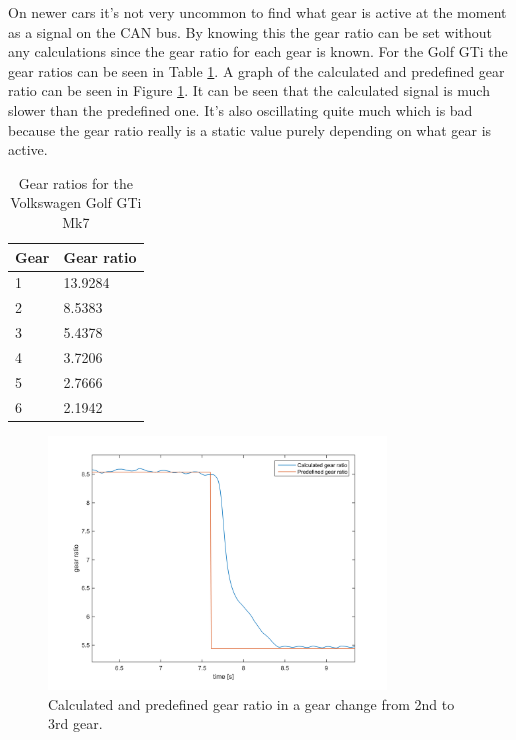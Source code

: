On newer cars it's not very uncommon to find what gear is active at the moment as a signal on the CAN bus. By knowing this the gear ratio can be set without any calculations since the gear ratio for each gear is known. For the Golf GTi the gear ratios can be seen in Table \ref{tab:gr}. A graph of the calculated and predefined gear ratio can be seen in Figure \ref{gear_ratio}. It can be seen that the calculated signal is much slower than the predefined one. It's also oscillating quite much which is bad because the gear ratio really is a static value purely depending on what gear is active. 


\begin{table}[position specifier]
	\centering
	\begin{tabular}{| l | l |}
		\hline
		Gear & Gear ratio \\ \hline
		1 & 13.9284 \\ \hline
		2 & 8.5383 \\ \hline
		3 & 5.4378 \\ \hline
		4 & 3.7206 \\ \hline
		5 & 2.7666 \\ \hline
		6 & 2.1942 \\ \hline
	\end{tabular}
	\caption{Gear ratios for the Volkswagen Golf GTi Mk7}
	\label{tab:gr}
\end{table}

\begin{figure}[h]
	\centering
	\includegraphics[width=0.8\textwidth]{Pictures/gear_ratio}
	\caption{Calculated and predefined gear ratio in a gear change from 2nd to 3rd gear.}
	\label{gear_ratio}
\end{figure}

